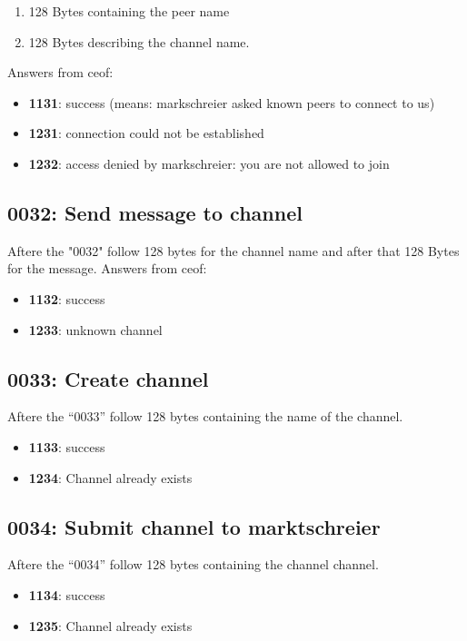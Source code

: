 \documentclass[12pt,a4paper]{book}
\begin{document}
\begin{enumerate}
\item 128 Bytes containing the peer name
\item 128 Bytes describing the channel name.
\end{enumerate}

Answers from ceof:
\begin{itemize}
\item \textbf{1131}: success (means: markschreier asked known peers to
connect to us)
\item \textbf{1231}: connection could not be established
\item \textbf{1232}: access denied by markschreier: you are not allowed to join
\end{itemize}
\subsection{0032: Send message to channel}
Aftere the "0032" follow 128 bytes for the channel name and after
that 128 Bytes for the message.
Answers from ceof:
\begin{itemize}
\item \textbf{1132}: success
\item \textbf{1233}: unknown channel
\end{itemize}
\subsection{0033: Create channel}
Aftere the "`0033"' follow 128 bytes containing the name of the channel.
\begin{itemize}
\item \textbf{1133}: success
\item \textbf{1234}: Channel already exists
\end{itemize}
\subsection{0034: Submit channel to marktschreier}
Aftere the "`0034"' follow 128 bytes containing the channel channel.
\begin{itemize}
\item \textbf{1134}: success
\item \textbf{1235}: Channel already exists
\end{itemize}
\end{document}
